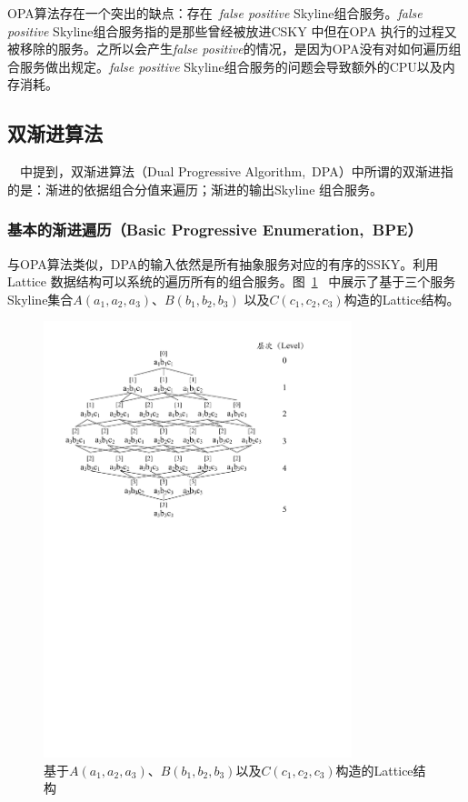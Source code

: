 OPA算法存在一个突出的缺点：存在~\emph{false positive} Skyline组合服务。\emph{false positive} Skyline组合服务指的是那些曾经被放进CSKY 中但在OPA 执行的过程又被移除的服务。之所以会产生\emph{false positive}的情况，是因为OPA没有对如何遍历组合服务做出规定。\emph{false positive} Skyline组合服务的问题会导致额外的CPU以及内存消耗。

\subsection{双渐进算法}

~\cite{yu2013efficient}~中提到，双渐进算法（Dual Progressive Algorithm,~DPA）中所谓的双渐进指的是：渐进的依据组合分值来遍历；渐进的输出Skyline 组合服务。

\subsubsection{基本的渐进遍历（Basic Progressive Enumeration,~BPE）}

与OPA算法类似，DPA的输入依然是所有抽象服务对应的有序的SSKY。利用Lattice 数据结构可以系统的遍历所有的组合服务。图~\ref{F:Fig_Lattice}~ 中展示了基于三个服务Skyline集合$A(a_{1}, a_{2}, a_{3})$、$B(b_{1}, b_{2}, b_{3})$ 以及$C(c_{1}, c_{2}, c_{3})$构造的Lattice结构。

\begin{figure}[thb]
\centering
    \includegraphics[width=0.8\textwidth]{./FIGs/Fig_Lattice.pdf}
\caption{基于$A(a_{1}, a_{2}, a_{3})$、$B(b_{1}, b_{2}, b_{3})$以及$C(c_{1}, c_{2}, c_{3})$构造的Lattice结构}
\label{F:Fig_Lattice}
\end{figure}

